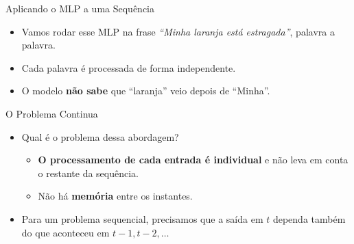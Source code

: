 \documentclass[aspectratio=169,xcolor=dvipsnames]{beamer}
\begin{document}
\begin{frame}{Aplicando o MLP a uma Sequência}
\begin{itemize}
    \item Vamos rodar esse MLP na frase \textit{``Minha laranja está estragada''}, palavra a palavra.
\end{itemize}
\vspace{0.4em}
\centering
{}
\vspace{0.4em}
\begin{itemize}
    \item Cada palavra é processada de forma independente.
    \item O modelo \textbf{não sabe} que ``laranja'' veio depois de ``Minha''.
\end{itemize}
\end{frame}

\begin{frame}{O Problema Continua}
\begin{itemize}
    \item Qual é o problema dessa abordagem?
    \begin{itemize}
        \item \textbf{O processamento de cada entrada é individual} e não leva em conta o restante da sequência.
        \item Não há \textbf{memória} entre os instantes.
    \end{itemize}
    \item Para um problema sequencial, precisamos que a saída em $t$ dependa também do que aconteceu em $t-1, t-2, \dots$
\end{itemize}
\end{frame}
\end{document}
